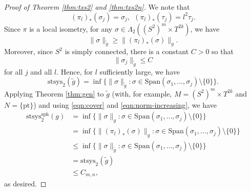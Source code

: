 \documentclass[10pt,a4paper]{amsart}
\begin{document}
\begin{proof}[Proof of Theorem \ref{thm:txs2} and \ref{thm:txs2n}]
We note that
\begin{equation}\label{eqn:cover} (\pi_l)_*(\sigma_j) = \sigma_j,\ \ (\pi_l)_*(\tau_j) = l^2\tau_j. \end{equation}
Since $\pi$ is a local isometry, for any $\sigma \in \Lambda_2((S^2)^m \times T^{2k})$, we have
\begin{equation}\label{eqn:norm-increasing} \|\sigma\|_{\tilde{g}} \geq \|(\pi_l)_*(\sigma)\|_g. \end{equation}
Moreover, since $S^2$ is simply connected, there is a constant $C > 0$ so that
\[ \|\sigma_j\|_{\tilde{g}} \leq C \]
for all $j$ and all $l$. Hence, for $l$ sufficiently large, we have
\[ \mathrm{stsys}_2(\tilde{g}) = \inf\{\|\sigma\|_{\tilde{g}} : \sigma \in \mathrm{Span}(\sigma_1, \hdots, \sigma_j) \setminus \{0\}\}. \]
Applying Theorem \ref{thm:gen} to $\tilde{g}$ (with, for example, $M = (S^2)^m \times T^{2k}$ and $N = \{\mathrm{pt}\}$) and using \eqref{eqn:cover} and \eqref{eqn:norm-increasing}, we have
\begin{align*}
\mathrm{stsys}_2^{\mathrm{sph}}(g)
& = \inf\{\|\sigma\|_g : \sigma \in \mathrm{Span}(\sigma_1, \hdots, \sigma_j) \setminus \{0\}\}\\
& = \inf\{\|(\pi_l)_*(\sigma)\|_g : \sigma \in \mathrm{Span}(\sigma_1, \hdots, \sigma_j) \setminus \{0\}\}\\
& \leq \inf\{\|\sigma\|_{\tilde{g}} : \sigma \in \mathrm{Span}(\sigma_1, \hdots, \sigma_j) \setminus \{0\}\}\\
& = \mathrm{stsys}_2(\tilde{g})\\
& \leq C_{m, n},
\end{align*}
as desired.
\end{proof}
\end{document}
